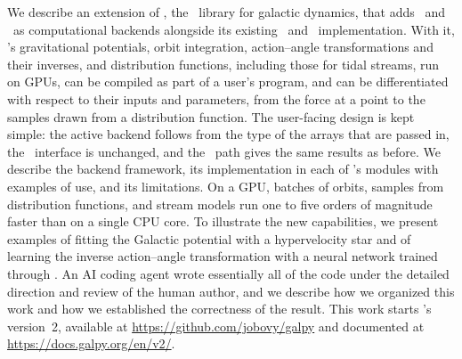 We describe an extension of \galpy, the \python\ library for galactic
dynamics, that adds \jax\ and \torch\ as computational backends
alongside its existing \numpy\ and \cc\ implementation. With it,
\galpy's gravitational potentials, orbit integration, action--angle
transformations and their inverses, and distribution functions,
including those for tidal streams, run on GPUs, can be compiled as part
of a user's program, and can be differentiated with respect to their
inputs and parameters, from the force at a point to the samples drawn
from a distribution function. The user-facing design is kept simple: the
active backend follows from the type of the arrays that are passed in,
the \galpy\ interface is unchanged, and the \numpy\ path gives the same
results as before. We describe the backend framework, its implementation in each of
\galpy's modules with examples of use, and its limitations. On a GPU, batches
of orbits, samples from distribution functions, and stream models run
one to five orders of magnitude faster than on a single CPU core. To
illustrate the new capabilities, we present examples of fitting
the Galactic potential with a hypervelocity star and of learning the
inverse action--angle transformation with a neural network trained
through \galpy. An AI coding agent wrote
essentially all of the code under the detailed direction and review of
the human author, and we describe how we organized this work and how we
established the correctness of the result. This work starts \galpy's version~2, available at
\url{https://github.com/jobovy/galpy} and documented at
\url{https://docs.galpy.org/en/v2/}.

